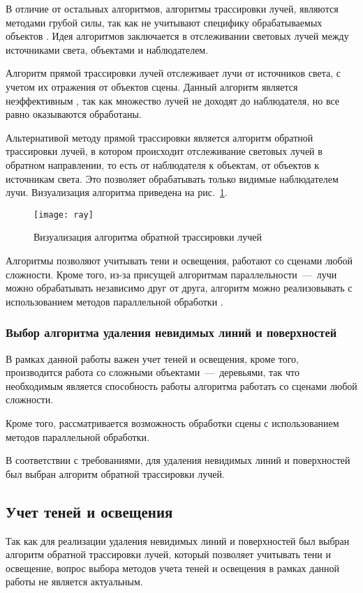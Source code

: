 В отличие от остальных алгоритмов, алгоритмы трассировки лучей, являются методами грубой силы, так как не учитывают специфику обрабатываемых объектов \cite{bib:8}. Идея алгоритмов заключается в отслеживании световых лучей между источниками света, объектами и наблюдателем. 

Алгоритм прямой трассировки лучей отслеживает лучи от источников света, с учетом их отражения от объектов сцены. Данный алгоритм является неэффективным \cite{bib:8}, так как множество лучей не доходят до наблюдателя, но все равно оказываются обработаны.

Альтернативой методу прямой трассировки является алгоритм обратной трассировки лучей, в котором происходит отслеживание световых лучей в обратном направлении, то есть от наблюдателя к объектам, от объектов к источникам света. Это позволяет обрабатывать только видимые наблюдателем лучи. Визуализация алгоритма приведена на рис.~\ref{img:raytracing}.

\noindent
\begin{figure}[h!]
	\centering
    \texttt{[image: ray]}
    \caption{Визуализация алгоритма обратной трассировки лучей}
    \label{img:raytracing}
\end{figure}

Алгоритмы позволяют учитывать тени и освещения, работают со сценами любой сложности. Кроме того, из-за присущей алгоритмам параллельности~---~лучи можно обрабатывать независимо друг от друга, алгоритм можно реализовывать с использованием методов параллельной обработки \cite{bib:9}.

\subsubsection{Выбор алгоритма удаления невидимых линий и поверхностей}
В рамках данной работы важен учет теней и освещения, кроме того, производится работа со сложными объектами~---~деревьями, так что необходимым является способность работы алгоритма работать со сценами любой сложности.

Кроме того, рассматривается возможность обработки сцены с использованием методов параллельной обработки. 

В соответствии с требованиями, для удаления невидимых линий и поверхностей был выбран алгоритм обратной трассировки лучей.


\subsection{Учет теней и освещения}
Так как для реализации удаления невидимых линий и поверхностей был выбран алгоритм обратной трассировки лучей, который позволяет учитывать тени и освещение, вопрос выбора методов учета теней и освещения в рамках данной работы не является актуальным.

